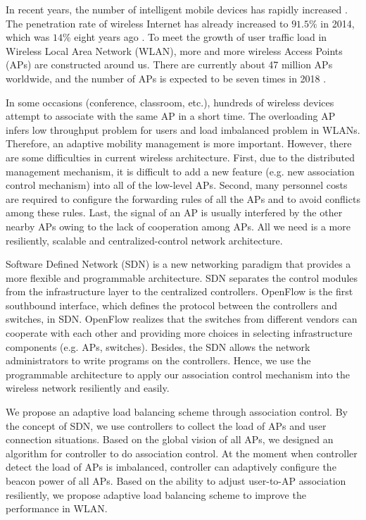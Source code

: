 In recent years, the number of intelligent mobile devices has rapidly increased \cite{tai2015comparative}. The penetration rate of wireless Internet has already increased to $91.5\%$ in 2014, which was $14\%$ eight years ago \cite{survey2014comparative}. To meet the growth of user traffic load in Wireless Local Area Network (WLAN), more and more wireless Access Points (APs) are constructed around us. There are currently about 47 million APs worldwide, and the number of APs is expected to be seven times in 2018 \cite{iPassSurvey}.

In some occasions (conference, classroom, etc.), hundreds of wireless devices attempt to associate with the same AP in a short time. The overloading AP infers low throughput problem for users and load imbalanced problem in WLANs. Therefore, an adaptive mobility management is more important. However, there are some difficulties in current wireless architecture. First, due to the distributed management mechanism, it is difficult to add a new feature (e.g. new association control mechanism) into all of the low-level APs. Second, many personnel costs are required to configure the forwarding rules of all the APs and to avoid conflicts among these rules.  Last, the signal of an AP is usually interfered by the other nearby APs owing to the lack of cooperation among APs. All we need is a more resiliently, scalable and centralized-control network architecture.

Software Defined Network (SDN) is a new networking paradigm that provides a more flexible and programmable architecture. SDN separates the control modules from the infrastructure layer to the centralized controllers. OpenFlow \cite{mckeown2008openflow} is the first southbound interface, which defines the protocol between the controllers and switches, in SDN. OpenFlow realizes that the switches from different vendors can cooperate with each other and providing more choices in selecting infrastructure components (e.g. APs, switches). Besides, the SDN allows the network administrators to write programs on the controllers. Hence, we use the programmable architecture to apply our association control mechanism into the wireless network resiliently and easily.

We propose an adaptive load balancing scheme through association control. By the concept of SDN, we use controllers to collect the load of APs and user connection situations. Based on the global vision of all APs, we designed an algorithm for controller to do association control. At the moment when controller detect the load of APs is imbalanced, controller can adaptively configure the beacon power of all APs. Based on the ability to adjust user-to-AP association resiliently, we propose adaptive load balancing scheme to improve the performance in WLAN.


